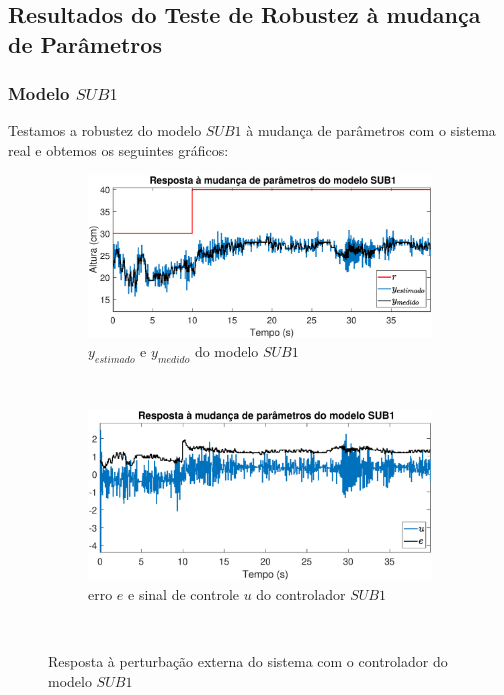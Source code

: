 \subsection{Resultados do Teste de Robustez à mudança de Parâmetros}\label{rmp}

\subsubsection{Modelo $SUB1$}
Testamos a robustez do modelo $SUB1$ à mudança de parâmetros com o sistema real e obtemos os seguintes gráficos:
\begin{figure}[htb]
	\centering
	\begin{subfigure}[t]{0.48\textwidth}
		\includegraphics[width=1\linewidth]{mprsub1y}
		\caption[$y_{estimado}$ e $y_{medido}$ do modelo $SUB1$]{$y_{estimado}$ e $y_{medido}$ do modelo $SUB1$}
		\label{fig:mprsub1y}
	\end{subfigure}
	~ %
	\begin{subfigure}[t]{0.48\textwidth}
		\includegraphics[width=1\linewidth]{mprsub1e}
		\caption[erro $e$ e sinal de controle $u$ do controlador $SUB1$]{erro $e$ e sinal de controle $u$ do controlador $SUB1$}
		\label{fig:mprsub1e}
	\end{subfigure}
	~ %
	
	\caption{Resposta à perturbação externa do sistema com o controlador do modelo $SUB1$}\label{fig:mprsub1}
\end{figure}

